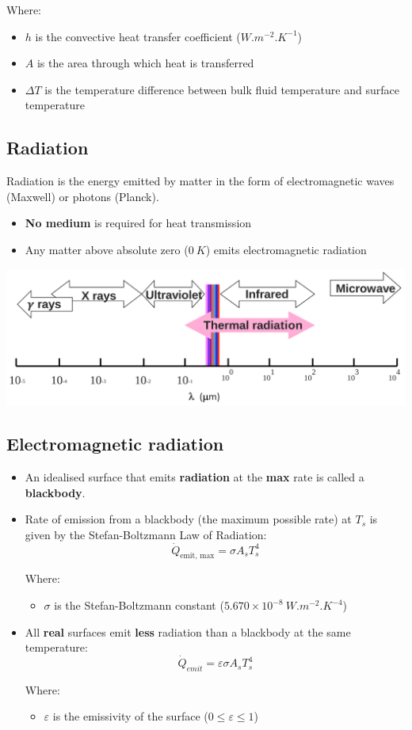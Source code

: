 \documentclass[11pt]{article}
\begin{document}
Where:
\begin{itemize}
\item \(h\) is the convective heat transfer coefficient (\(\unit{W.m^{-2}.K^{-1}}\))
\item \(A\) is the area through which heat is transferred
\item \(\Delta T\) is the temperature difference between bulk fluid temperature and surface temperature
\end{itemize}
\subsection{Radiation}
\label{sec:org6d24b08}
Radiation is the energy emitted by matter in the form of electromagnetic waves (Maxwell) or photons (Planck).
\begin{itemize}
\item \textbf{No medium} is required for heat transmission
\item Any matter above absolute zero (\(\qty{0}{K}\)) emits electromagnetic radiation
\end{itemize}

\begin{center}
\includegraphics[width=.9\linewidth]{./images/electromagnetic-spectrum-for-thermal-radiation.png}
\end{center}

 \newpage
\subsection{Electromagnetic radiation}
\label{sec:org6aae45e}
\begin{itemize}
\item An idealised surface that emits \textbf{radiation} at the \textbf{max} rate is called a \textbf{blackbody}.
\item Rate of emission from a blackbody (the maximum possible rate) at \(T_s\) is given by the Stefan-Boltzmann Law of Radiation:
\[\dot{Q}_{\text{emit, max}} = \sigma A_s T_s^4\]

Where:
\begin{itemize}
\item \(\sigma\) is the Stefan-Boltzmann constant (\(5.670 \times 10^{-8} \ \unit{W.m^{-2}.K^{-4}}\))
\end{itemize}

\item All \textbf{real} surfaces emit \textbf{less} radiation than a blackbody at the same temperature:
\[\dot{Q}_{emit} = \varepsilon \sigma A_s T_s^4\]

Where:
\begin{itemize}
\item \(\varepsilon\) is the emissivity of the surface (\(0 \le \varepsilon \le 1\))
\end{itemize}
\end{itemize}
\end{document}
